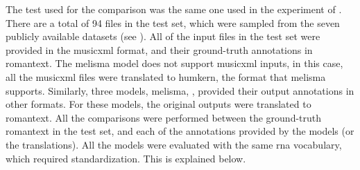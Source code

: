 
The test used for the comparison was the same one used in
the experiment of .
There are a total of 94 files in the test set, which were
sampled from the seven publicly available datasets (see
). All of the input files
in the test set were provided in the \gls{musicxml} format,
and their ground-truth annotations in \gls{romantext}. The
\gls{melisma} model does not support \gls{musicxml} inputs,
in this case, all the \gls{musicxml} files were translated
to \gls{humkern}, the format that \gls{melisma} supports.
Similarly, three models, \gls{melisma},
\textcite{chen2021attend, mcleod2021modular}, provided their
output annotations in other formats. For these models, the
original outputs were translated to \gls{romantext}. All the
comparisons were performed between the ground-truth
\gls{romantext} in the test set, and each of the annotations
provided by the models (or the translations). All the models
were evaluated with the same \gls{rna} vocabulary, which
required standardization. This is explained below.

